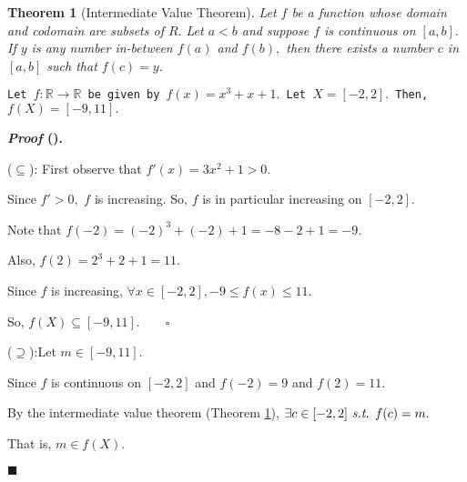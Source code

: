 \documentclass[12pt,a4paper]{article}
\newtheorem{thm}{Theorem}[subsection]
\newcounter{nprf}[subsection]
\newenvironment*{prf}{\par\indent\textbf{\textit{Proof} (\stepcounter{nprf}\thenprf). }\par }{\par\hfill $\blacksquare$\par}
\def\R{{\mathbb{R}}}
\def\st{\emph{ s.t. }}
\begin{document}
\begin{thm}[Intermediate Value Theorem]\label{thm3.1.1}
	Let $f$ be a function whose domain and codomain are subsets of $R.$ Let $a<b$ and suppose $f$ is continuous on $[a,b].$ If $y$ is any number in-between $f(a)$ and $f(b),$ then there exists a number $c$ in $[a,b]$ such that $f(c)=y.$
\end{thm}
\begin{framed}
\noindent\texttt{Let $f:\R\to\R$ be given by $f(x)=x^3+x+1.$ Let $X=[-2,2].$ Then, $f(X)=[-9,11].$}
\begin{prf}
	($\subseteq$): First observe that $f'(x)=3x^2+1>0.$\par\hspace{5mm} Since $f'>0,$ $f$ is increasing. So, $f$ is in particular increasing on $[-2,2].$\par\hspace{5mm} Note that $f(-2)=(-2)^3+(-2)+1=-8-2+1=-9.$\par\hspace{5mm} Also, $f(2)=2^3+2+1=11.$\par\hspace{5mm} Since $f$ is increasing, $\forall x\in[-2,2], -9\leq f(x)\leq11.$\par\hspace{5mm} So, $f(X)\subseteq[-9,11].\qquad\square$ \par
	($\supseteq$):Let $m\in[-9,11].$\par\hspace{5mm} Since $f$ is continuous on $[-2,2]$ and $f(-2)=9$ and $f(2)=11.$\par\hspace{5mm} By the intermediate value theorem (Theorem \ref{thm3.1.1}), $\exists c\in[-2,2]\st f(c)=m.$\par\hspace{5mm} That is, $m\in f(X).$
\end{prf}	
\end{framed}
\end{document}
